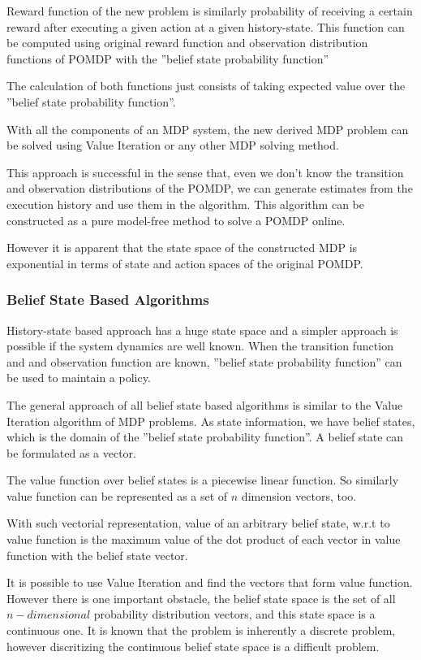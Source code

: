Reward function of the new problem is similarly probability of receiving a certain reward after executing a given action at a given history-state. This function can be computed using original reward function and observation distribution functions of POMDP with the ''belief state probability function''

The calculation of both functions just consists of taking expected value over the ''belief state probability function''.

With all the components of an MDP system, the new derived MDP problem can be solved using Value Iteration or any other MDP solving method.

This approach is successful in the sense that, even we don't know the transition and observation distributions of the POMDP, we can generate estimates from the execution history and use them in the algorithm. This algorithm can be constructed as a pure model-free method to solve a POMDP online.

However it is apparent that the state space of the constructed MDP is exponential in terms of state and action spaces of the original POMDP.

\subsubsection{Belief State Based Algorithms}

History-state based approach has a huge state space and a simpler approach is possible if the system dynamics are well known. When the transition function and and observation function are known, ''belief state probability function'' can be used to maintain a policy.

The general approach of all belief state based algorithms is similar to the Value Iteration algorithm of MDP problems. As state information, we have belief states, which is the domain of the ''belief state probability function''. A belief state can be formulated as a vector.

The value function over belief states is a piecewise linear function. So similarly value function can be represented as a set of $n$ dimension vectors, too.

With such vectorial representation, value of an arbitrary belief state, w.r.t to value function is the maximum value of the dot product of each vector in value function with the belief state vector.

It is possible to use Value Iteration and find the vectors that form value function. However there is one important obstacle, the belief state space is the set of all $n-dimensional$ probability distribution vectors, and this state space is a continuous one. It is known that the problem is inherently a discrete problem, however discritizing the continuous belief state space is a difficult problem.

